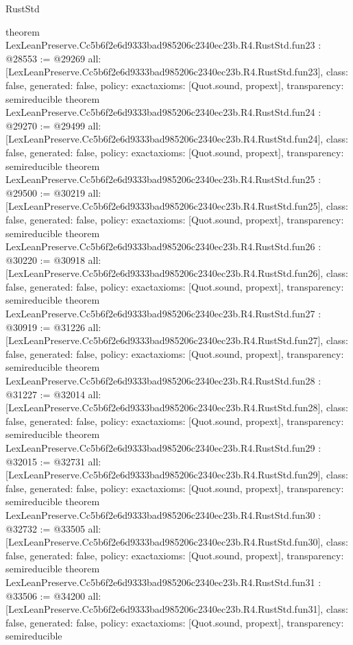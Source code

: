 \begin{lexlean}{RustStd}
\begin{coremodule}
{}
theorem LexLeanPreserve.Cc5b6f2e6d9333bad985206c2340ec23b.R4.RustStd.fun23 : @28553 := @29269 {
  all: [LexLeanPreserve.Cc5b6f2e6d9333bad985206c2340ec23b.R4.RustStd.fun23],
  class: false,
  generated: false,
  policy: exact{axioms: [Quot.sound, propext]},
  transparency: semireducible
}
theorem LexLeanPreserve.Cc5b6f2e6d9333bad985206c2340ec23b.R4.RustStd.fun24 : @29270 := @29499 {
  all: [LexLeanPreserve.Cc5b6f2e6d9333bad985206c2340ec23b.R4.RustStd.fun24],
  class: false,
  generated: false,
  policy: exact{axioms: [Quot.sound, propext]},
  transparency: semireducible
}
theorem LexLeanPreserve.Cc5b6f2e6d9333bad985206c2340ec23b.R4.RustStd.fun25 : @29500 := @30219 {
  all: [LexLeanPreserve.Cc5b6f2e6d9333bad985206c2340ec23b.R4.RustStd.fun25],
  class: false,
  generated: false,
  policy: exact{axioms: [Quot.sound, propext]},
  transparency: semireducible
}
theorem LexLeanPreserve.Cc5b6f2e6d9333bad985206c2340ec23b.R4.RustStd.fun26 : @30220 := @30918 {
  all: [LexLeanPreserve.Cc5b6f2e6d9333bad985206c2340ec23b.R4.RustStd.fun26],
  class: false,
  generated: false,
  policy: exact{axioms: [Quot.sound, propext]},
  transparency: semireducible
}
theorem LexLeanPreserve.Cc5b6f2e6d9333bad985206c2340ec23b.R4.RustStd.fun27 : @30919 := @31226 {
  all: [LexLeanPreserve.Cc5b6f2e6d9333bad985206c2340ec23b.R4.RustStd.fun27],
  class: false,
  generated: false,
  policy: exact{axioms: [Quot.sound, propext]},
  transparency: semireducible
}
theorem LexLeanPreserve.Cc5b6f2e6d9333bad985206c2340ec23b.R4.RustStd.fun28 : @31227 := @32014 {
  all: [LexLeanPreserve.Cc5b6f2e6d9333bad985206c2340ec23b.R4.RustStd.fun28],
  class: false,
  generated: false,
  policy: exact{axioms: [Quot.sound, propext]},
  transparency: semireducible
}
theorem LexLeanPreserve.Cc5b6f2e6d9333bad985206c2340ec23b.R4.RustStd.fun29 : @32015 := @32731 {
  all: [LexLeanPreserve.Cc5b6f2e6d9333bad985206c2340ec23b.R4.RustStd.fun29],
  class: false,
  generated: false,
  policy: exact{axioms: [Quot.sound, propext]},
  transparency: semireducible
}
theorem LexLeanPreserve.Cc5b6f2e6d9333bad985206c2340ec23b.R4.RustStd.fun30 : @32732 := @33505 {
  all: [LexLeanPreserve.Cc5b6f2e6d9333bad985206c2340ec23b.R4.RustStd.fun30],
  class: false,
  generated: false,
  policy: exact{axioms: [Quot.sound, propext]},
  transparency: semireducible
}
theorem LexLeanPreserve.Cc5b6f2e6d9333bad985206c2340ec23b.R4.RustStd.fun31 : @33506 := @34200 {
  all: [LexLeanPreserve.Cc5b6f2e6d9333bad985206c2340ec23b.R4.RustStd.fun31],
  class: false,
  generated: false,
  policy: exact{axioms: [Quot.sound, propext]},
  transparency: semireducible
}
\end{coremodule}
\end{lexlean}
